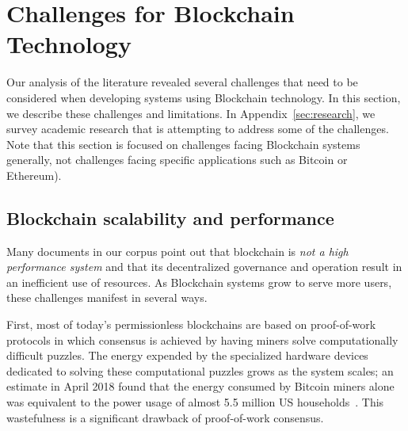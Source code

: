 


\section{Challenges for Blockchain Technology}
\label{sec:challenges}

Our analysis of the literature revealed several challenges that need to be considered when developing systems using Blockchain technology.
In this section, we describe these challenges and limitations.
In Appendix~\ref{sec:research}, we survey academic research that is attempting to address some of the challenges.
Note that this section is focused on challenges facing Blockchain systems generally, not challenges facing specific applications such as Bitcoin or Ethereum).

\subsection{Blockchain scalability and performance}
Many documents in our corpus point out that blockchain is \emph{not a high performance system} and that its decentralized governance and operation result in an inefficient use of resources. As Blockchain systems grow to serve more users, these challenges manifest in several ways. 

First, most of today's permissionless blockchains are based on proof-of-work protocols in which consensus is achieved by having miners solve computationally difficult puzzles. The energy expended by the specialized hardware devices dedicated to solving these computational puzzles grows as the system scales; an estimate in April 2018 found that the energy consumed by Bitcoin miners alone was equivalent to the power usage of almost 5.5 million US households~\cite{Digiconomist}. This wastefulness is a significant drawback of proof-of-work consensus.

